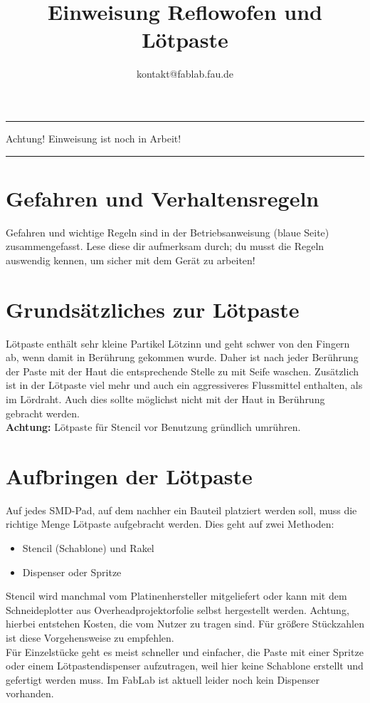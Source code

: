 \documentclass{\basedir/fablab-document}
\author{kontakt@fablab.fau.de}
\title{Einweisung Reflowofen und Lötpaste}
\begin{document}
\color{red}
\hrule
\begin{center}
\large{Achtung! Einweisung ist noch in Arbeit!}
\vspace{0.1cm}
\end{center}
\hrule
\color{black}
\tableofcontents

\section{Gefahren und Verhaltensregeln}
Gefahren und wichtige Regeln sind in der Betriebsanweisung (blaue Seite) zusammengefasst. Lese diese dir aufmerksam durch; du musst die Regeln auswendig kennen, um sicher mit dem Gerät zu arbeiten!


\section{Grundsätzliches zur Lötpaste}
Lötpaste enthält sehr kleine Partikel Lötzinn und geht schwer von den Fingern ab, wenn damit in Berührung gekommen wurde. Daher ist nach jeder Berührung der Paste mit der Haut die entsprechende Stelle zu mit Seife waschen. Zusätzlich ist in der Lötpaste viel mehr und auch ein aggressiveres Flussmittel enthalten, als im Lördraht. Auch dies sollte möglichst nicht mit der Haut in Berührung gebracht werden. \\

\textbf{Achtung:} Lötpaste für Stencil vor Benutzung gründlich umrühren.

\section{Aufbringen der Lötpaste}
Auf jedes SMD-Pad, auf dem nachher ein Bauteil platziert werden soll, muss die richtige Menge Lötpaste aufgebracht werden. Dies geht auf zwei Methoden:
\begin{itemize}
	\item Stencil (Schablone) und Rakel
	\item Dispenser oder Spritze
\end{itemize}
Stencil wird manchmal vom Platinenhersteller mitgeliefert oder kann mit dem Schneideplotter aus Overheadprojektorfolie selbst hergestellt werden. Achtung, hierbei entstehen Kosten, die vom Nutzer zu tragen sind. Für größere Stückzahlen ist diese Vorgehensweise zu empfehlen.\\
Für Einzelstücke geht es meist schneller und einfacher, die Paste mit einer Spritze oder einem Lötpastendispenser aufzutragen, weil hier keine Schablone erstellt und gefertigt werden muss. Im FabLab ist aktuell leider noch kein Dispenser vorhanden.
\end{document}

